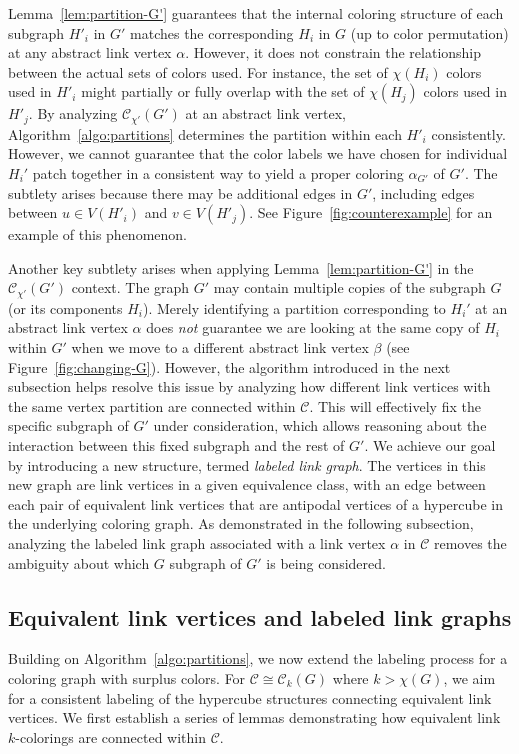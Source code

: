 \documentclass{amsart}
\theoremstyle{hypothesisstyle}
\theoremstyle{definition}
\theoremstyle{remark}
\numberwithin{equation}{section}
\newcommand{\C}{\mathcal C}
\begin{document}
Lemma~\ref{lem:partition-G'} guarantees that the internal coloring structure of each subgraph $H'_i$ in $G'$ matches the corresponding $H_i$ in $G$ (up to color permutation) at any abstract link vertex $\alpha$. However, it does not constrain the relationship between the actual sets of colors used. For instance, the set of $\chi(H_i)$ colors used in $H'_i$ might partially or fully overlap with the set of $\chi(H_j)$ colors used in $H'_j$. By analyzing $\mathcal{C}_{\chi'}(G')$ at an abstract link vertex, Algorithm~\ref{algo:partitions} determines the partition within each $H'_i$ consistently. However, we cannot guarantee that the color labels we have chosen for individual $H_i'$ patch together in a consistent way to yield a proper coloring $\alpha_{G'}$ of $G'$. The subtlety arises because there may be additional edges in $G'$, including edges between $u\in V(H'_i)$ and $v\in V(H'_j)$. See Figure~\ref{fig:counterexample} for an example of this phenomenon. 

Another key subtlety arises when applying Lemma~\ref{lem:partition-G'} in the $\mathcal{C}_{\chi'}(G')$ context. The graph $G'$ may contain multiple copies of the subgraph $G$ (or its components $H_i$). Merely identifying a partition corresponding to $H_i'$ at an abstract link vertex $\alpha$ does \emph{not} guarantee we are looking at the same copy of $H_i$ within $G'$ when we move to a different abstract link vertex $\beta$ (see Figure~\ref{fig:changing-G}). However, the algorithm introduced in the next subsection helps resolve this issue by analyzing how different link vertices with the same vertex partition are connected within $\mathcal{C}$. This will effectively fix the specific subgraph of $G'$ under consideration, which allows reasoning about the interaction between this fixed subgraph and the rest of $G'$. We achieve our goal by introducing a new structure, termed \emph{labeled link graph}. The vertices in this new graph are link vertices in a given equivalence class, with an edge between each pair of equivalent link vertices that are antipodal vertices of a hypercube in the underlying coloring graph. As demonstrated in the following subsection, analyzing the labeled link graph associated with a link vertex $\alpha$ in $\mathcal{C}$ removes the ambiguity about which $G$ subgraph of $G'$ is being considered.


\subsection{Equivalent link vertices and labeled link graphs}\label{subsect:LLG}
Building on Algorithm~\ref{algo:partitions}, we now extend the labeling process for a coloring graph with surplus colors. For $\C\cong\C_k(G)$ where $k>\chi(G)$, we aim for a consistent labeling of the hypercube structures connecting equivalent link vertices.
We first establish a series of lemmas demonstrating how equivalent link $k$-colorings are connected within $\mathcal{C}$. 
\end{document}
